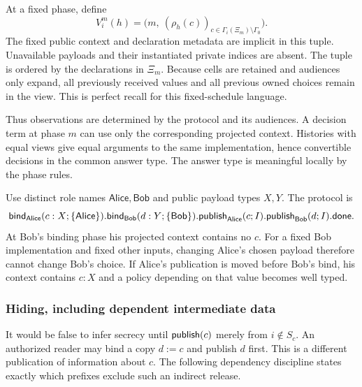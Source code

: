 At a fixed phase, define
\begin{equation}
 V_i^m(h)=\bigl(m,\ (\rho_h(c))_{c\in\Gamma_i(\Xi_m)\setminus\Gamma_0}\bigr).
 \label{dep:eq:22}
\end{equation}
The fixed public context and declaration metadata are implicit in this
tuple. Unavailable payloads and their instantiated private indices are
absent. The tuple is ordered by the declarations in $\Xi_m$.
Because cells are retained and audiences only expand, all previously
received values and all previous owned choices remain in the view.
This is perfect recall for this fixed-schedule language.

Thus observations are determined by the protocol and its audiences.
A decision term at phase $m$ can use only the corresponding projected
context. Histories with equal views give equal arguments to the same
implementation, hence convertible decisions in the common answer type.
The answer type is meaningful locally by the phase rules.

\begin{example}
Use distinct role names $\mathsf{Alice},\mathsf{Bob}$ and public payload
types $X,Y$. The protocol is
\begin{equation}
 \mathsf{bind}_{\mathsf{Alice}}(c:X;\{\mathsf{Alice}\}).
 \mathsf{bind}_{\mathsf{Bob}}(d:Y;\{\mathsf{Bob}\}).
 \mathsf{publish}_{\mathsf{Alice}}(c;I).
 \mathsf{publish}_{\mathsf{Bob}}(d;I).
 \mathsf{done}.
 \label{dep:eq:23}
\end{equation}
At Bob's binding phase his projected context contains no $c$.
For a fixed Bob implementation and fixed other inputs, changing Alice's
chosen payload therefore cannot change Bob's choice.
If Alice's publication is moved before Bob's bind, his context contains
$c:X$ and a policy depending on that value becomes well typed.
\end{example}

\subsubsection{Hiding, including dependent intermediate data}
\label{sec:hiding}

It would be false to infer secrecy until $\mathsf{publish}(c)$ merely from
$i\notin S_c$. An authorized reader may bind a copy $d:=c$ and publish
$d$ first. This is a different publication of information about $c$.
The following dependency discipline states exactly which prefixes exclude
such an indirect release.

